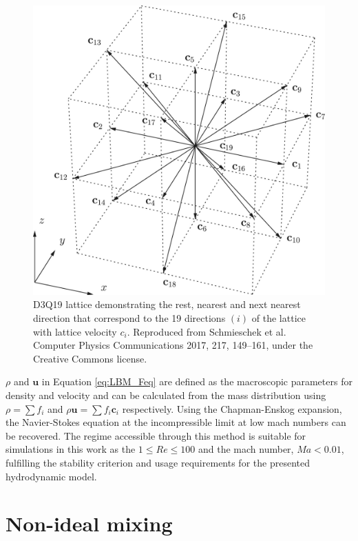 \begin{figure}[h]
    \centering
    \includegraphics[scale = 1]{figures/methods/d3q19_lattice.jpg}
    \caption{D3Q19 lattice demonstrating the rest, nearest and next nearest direction that correspond to the 19 
    directions $(i)$ of the lattice with lattice velocity $c_{i}$. \cite{schmieschek_lb3d_2017} Reproduced from 
    Schmieschek et al. Computer Physics Communications 2017, 217, 149--161, under the Creative Commons license.}
    \label{fig:d3q19_lattice}
\end{figure}

$\rho$ and $\textbf{u}$ in Equation \ref{eq:LBM_Feq} are defined as the macroscopic parameters for density and velocity 
and can be calculated from the mass distribution using $\rho = \sum f_i$ and $\rho \mathbf{u} = \sum f_i \mathbf{c}_i$ 
respectively. Using the Chapman-Enskog expansion, the Navier-Stokes equation at the incompressible limit at low mach
numbers can be recovered. \cite{qian_lattice_1992, he_lattice_1997} The regime accessible through this method is suitable 
for simulations in this work as the $ 1 \leq Re \leq 100 $ and the mach number, $Ma < 0.01$, fulfilling the stability 
criterion and usage requirements for the presented hydrodynamic model.

\section{Non-ideal mixing}
\label{section:lbm_non_ideal_mixing}


